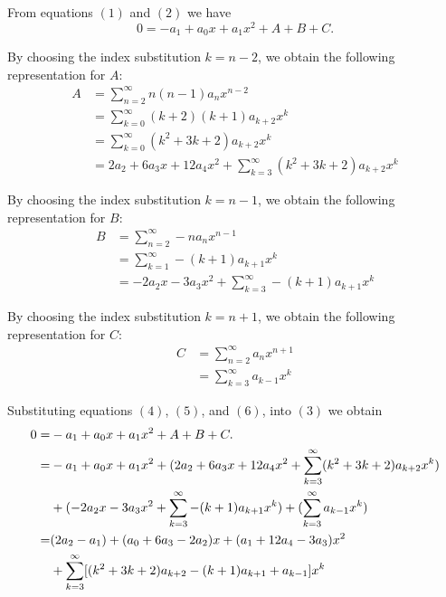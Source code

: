 \documentclass{article}
\begin{document}
    From equations $(1)$ and $(2)$ we have 
    \begin{equation}
    	0 = -a_{1} + a_{0}x + a_{1}x^{2} + A + B + C.
    \end{equation}
    
    By choosing the index substitution $k=n-2$, we obtain the following representation for $A$:
    \begin{equation}
    \begin{split}
		A & = \sum\limits_{n=2}^{\infty}n(n-1)a_{n}x^{n-2} \\
		& = \sum\limits_{k=0}^{\infty}(k+2)(k+1)a_{k+2}x^{k} \\
		& = \sum\limits_{k=0}^{\infty}(k^{2}+3k+2)a_{k+2}x^{k} \\
		& = 2a_{2} + 6a_{3}x + 12a_{4}x^{2} + \sum\limits_{k=3}^{\infty}(k^{2}+3k+2)a_{k+2}x^{k}
	\end{split}
    \end{equation}
    
    By choosing the index substitution $k=n-1$, we obtain the following representation for $B$:
    \begin{equation}
    \begin{split}
		B & = \sum\limits_{n=2}^{\infty}-na_{n}x^{n-1} \\
		& = \sum\limits_{k=1}^{\infty}-(k+1)a_{k+1}x^{k} \\
		& = -2a_{2}x - 3a_{3}x^{2} + \sum\limits_{k=3}^{\infty}-(k+1)a_{k+1}x^{k}
	\end{split}
    \end{equation}
    
    By choosing the index substitution $k=n+1$, we obtain the following representation for $C$:
    \begin{equation}
    \begin{split}
		C & = \sum\limits_{n=2}^{\infty}a_{n}x^{n+1} \\
		& = \sum\limits_{k=3}^{\infty}a_{k-1}x^{k}
	\end{split}
    \end{equation}
    
    Substituting equations $(4)$, $(5)$, and $(6)$, into $(3)$ we obtain
    \begin{equation}
    \begin{split}
    	0 = & -a_{1} + a_{0}x + a_{1}x^{2} + A + B + C. \\
    	= & -a_{1} + a_{0}x + a_{1}x^{2} + (2a_{2} + 6a_{3}x + 12a_{4}x^{2} + \sum\limits_{k=3}^{\infty}(k^{2}+3k+2)a_{k+2}x^{k}) \\
    	& \space \space + (-2a_{2}x - 3a_{3}x^{2} + \sum\limits_{k=3}^{\infty}-(k+1)a_{k+1}x^{k}) + (\sum\limits_{k=3}^{\infty}a_{k-1}x^{k}) \\
    	= & (2a_{2}-a_{1}) + (a_{0}+6a_{3}-2a_{2})x  + (a_{1}+12a_{4}-3a_{3})x^{2} \\
    	& + \sum\limits_{k=3}^{\infty}[(k^{2}+3k+2)a_{k+2} -(k+1)a_{k+1} + a_{k-1}]x^{k}
    \end{split}
    \end{equation}
    
\end{document}
